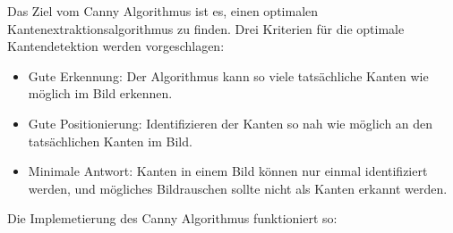 Das Ziel vom Canny Algorithmus \cite{canny2}
 ist es, einen optimalen Kantenextraktionsalgorithmus zu finden. Drei Kriterien für die optimale Kantendetektion werden vorgeschlagen:

\begin{itemize}

\item Gute Erkennung: Der Algorithmus kann so viele tatsächliche Kanten wie möglich im Bild erkennen.
\item Gute Positionierung: Identifizieren der Kanten so nah wie möglich an den tatsächlichen Kanten im Bild.
\item Minimale Antwort: Kanten in einem Bild können nur einmal identifiziert werden, und mögliches Bildrauschen sollte nicht als Kanten erkannt werden.

\end{itemize}

Die Implemetierung des Canny Algorithmus funktioniert so:

